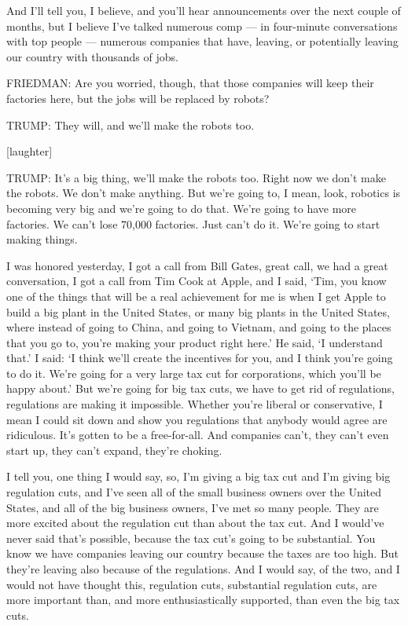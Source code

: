 And I'll tell you, I believe, and you'll hear announcements over the
next couple of months, but I believe I've talked numerous comp --- in
four-minute conversations with top people --- numerous companies that
have, leaving, or potentially leaving our country with thousands of
jobs.

FRIEDMAN: Are you worried, though, that those companies will keep their
factories here, but the jobs will be replaced by robots?

TRUMP: They will, and we'll make the robots too.

{[}laughter{]}

TRUMP: It's a big thing, we'll make the robots too. Right now we don't
make the robots. We don't make anything. But we're going to, I mean,
look, robotics is becoming very big and we're going to do that. We're
going to have more factories. We can't lose 70,000 factories. Just can't
do it. We're going to start making things.

I was honored yesterday, I got a call from Bill Gates, great call, we
had a great conversation, I got a call from Tim Cook at Apple, and I
said, `Tim, you know one of the things that will be a real achievement
for me is when I get Apple to build a big plant in the United States, or
many big plants in the United States, where instead of going to China,
and going to Vietnam, and going to the places that you go to, you're
making your product right here.' He said, `I understand that.' I said:
`I think we'll create the incentives for you, and I think you're going
to do it. We're going for a very large tax cut for corporations, which
you'll be happy about.' But we're going for big tax cuts, we have to get
rid of regulations, regulations are making it impossible. Whether you're
liberal or conservative, I mean I could sit down and show you
regulations that anybody would agree are ridiculous. It's gotten to be a
free-for-all. And companies can't, they can't even start up, they can't
expand, they're choking.

I tell you, one thing I would say, so, I'm giving a big tax cut and I'm
giving big regulation cuts, and I've seen all of the small business
owners over the United States, and all of the big business owners, I've
met so many people. They are more excited about the regulation cut than
about the tax cut. And I would've never said that's possible, because
the tax cut's going to be substantial. You know we have companies
leaving our country because the taxes are too high. But they're leaving
also because of the regulations. And I would say, of the two, and I
would not have thought this, regulation cuts, substantial regulation
cuts, are more important than, and more enthusiastically supported, than
even the big tax cuts.

